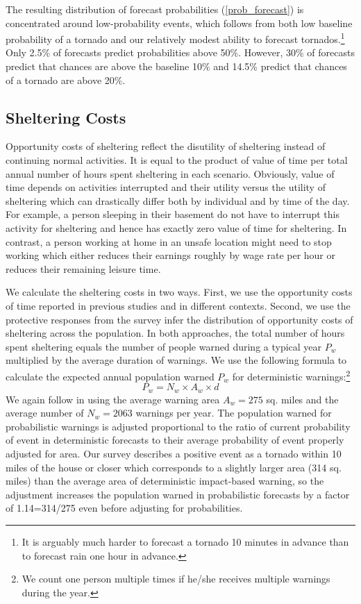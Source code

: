 \documentclass{ametsocV6.1}
\newcommand{\add}[1]{{\color{red}#1}}
\begin{document}
The resulting distribution of forecast probabilities (\ref{prob_forecast}) is concentrated around low-probability events, which follows from both low baseline probability of a tornado and our relatively modest ability to forecast tornados.\footnote{It is arguably much harder to forecast a tornado 10 minutes in advance than to forecast rain one hour in advance.} Only 2.5\% of forecasts predict probabilities above 50\%. However, 30\% of forecasts predict that chances are above the baseline 10\% and 14.5\% predict that chances of a tornado are above 20\%.


\vspace{10pt}
\subsection{Sheltering Costs}
Opportunity costs of sheltering reflect the disutility of sheltering instead of continuing normal activities. It is equal to the product of value of time per total annual number of hours  spent sheltering in each scenario. Obviously, value of time depends on activities interrupted and their utility versus the utility of sheltering which can drastically differ both by individual and by time of the day. For example, a person sleeping in their basement do not have to interrupt this activity for sheltering and hence has exactly zero value of time for sheltering. In contrast, a person working at home in an unsafe location might need to stop working which either reduces their earnings roughly by wage rate per hour or reduces their remaining leisure time.  

\add{We calculate the sheltering costs in two ways. First, we use the opportunity costs of time reported in previous studies and in different contexts. Second, we use the protective responses from the survey infer the distribution of opportunity costs of sheltering across the population. In both approaches, } the total number of hours spent sheltering equals the number of people warned during a typical year $P_w$ multiplied by the average duration of warnings. We use the following formula to calculate the expected annual population warned $P_w$ for deterministic warnings:\footnote{We count one person multiple times if he/she receives multiple warnings during the year.}
$$P_w= N_w \times A_w \times d $$
We again follow \citet{howard_firm_2021} in using the average warning area $A_w=275$ sq. miles and the average number of $N_w=2063$ warnings per year. The population warned for probabilistic warnings is adjusted proportional to the ratio of current probability of event in deterministic forecasts to their average probability of event properly adjusted for area. Our survey describes a positive event as a tornado within 10 miles of the house or closer which corresponds to a slightly larger area (314 sq. miles) than the average area of deterministic impact-based warning, so the adjustment increases the population warned in probabilistic forecasts by a factor of 1.14=314/275 even before adjusting for probabilities.
\end{document}
